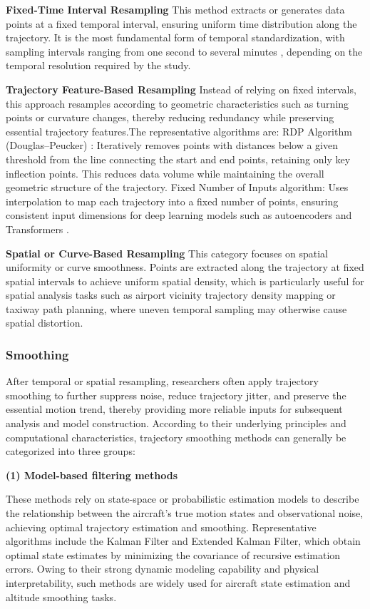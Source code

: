 \textbf{Fixed-Time Interval Resampling}
This method extracts or generates data points at a fixed temporal interval, ensuring uniform time distribution along the trajectory.
It is the most fundamental form of temporal standardization, with sampling intervals ranging from one second \cite{WANG2020101840} to several minutes \cite{vos2024transformer}, depending on the temporal resolution required by the study.

\textbf{Trajectory Feature-Based Resampling}
Instead of relying on fixed intervals, this approach resamples according to geometric characteristics such as turning points or curvature changes, thereby reducing redundancy while preserving essential trajectory features.The representative algorithms are: RDP Algorithm (Douglas–Peucker) \cite{SCHULTZ2022102164}: Iteratively removes points with distances below a given threshold from the line connecting the start and end points, retaining only key inflection points. This reduces data volume while maintaining the overall geometric structure of the trajectory. 
Fixed Number of Inputs algorithm: Uses interpolation to map each trajectory into a fixed number of points, ensuring consistent input dimensions for deep learning models such as autoencoders \cite{olive2018detecting} and Transformers \cite{BAO2024102667}.

\textbf{Spatial or Curve-Based Resampling}
This category focuses on spatial uniformity or curve smoothness.
Points are extracted along the trajectory at fixed spatial intervals to achieve uniform spatial density, which is particularly useful for spatial analysis tasks such as airport vicinity trajectory density mapping or taxiway path planning, where uneven temporal sampling may otherwise cause spatial distortion.

\subsubsection{Smoothing}

After temporal or spatial resampling, researchers often apply trajectory smoothing to further suppress noise, reduce trajectory jitter, and preserve the essential motion trend, thereby providing more reliable inputs for subsequent analysis and model construction.
According to their underlying principles and computational characteristics, trajectory smoothing methods can generally be categorized into three groups:

\textbf{(1) Model-based filtering methods}

These methods rely on state-space or probabilistic estimation models to describe the relationship between the aircraft’s true motion states and observational noise, achieving optimal trajectory estimation and smoothing.
Representative algorithms include the Kalman Filter \cite{LU2021102970} and Extended Kalman Filter, which obtain optimal state estimates by minimizing the covariance of recursive estimation errors. Owing to their strong dynamic modeling capability and physical interpretability, such methods are widely used for aircraft state estimation and altitude smoothing tasks.

